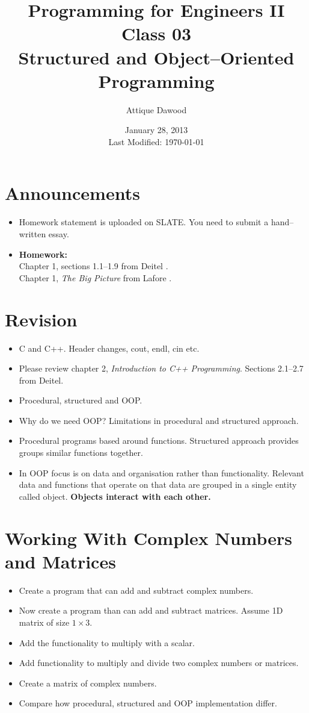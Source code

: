 \documentclass[12pt,a4paper]{article}
\title{\vspace{-2cm}Programming for Engineers II\\Class 03\\Structured and Object--Oriented Programming}
\author{Attique Dawood}
\date{January 28, 2013\\[0.2cm] Last Modified: \today}
\begin{document}
\maketitle
\section{Announcements}
\begin{itemize}
\item Homework statement is uploaded on SLATE. You need to submit a hand--written essay.
\item \textbf{Homework:}\\
Chapter 1, sections 1.1--1.9 from Deitel \cite{Deitel}.\\
Chapter 1, \textit{The Big Picture} from Lafore \cite{Lafore}.\\
\end{itemize}
\section{Revision}
\begin{itemize}
\item C and C++. Header changes, cout, endl, cin etc.
\item Please review chapter 2, \textit{Introduction to C++ Programming}. Sections 2.1--2.7 from Deitel.
\item Procedural, structured and OOP.
\item Why do we need OOP? Limitations in procedural and structured approach.
\item Procedural programs based around functions. Structured approach provides groups similar functions together.
\item In OOP focus is on data and organisation rather than functionality. Relevant data and functions that operate on that data are grouped in a single entity called object. \textbf{Objects interact with each other.}
\end{itemize}
\section{Working With Complex Numbers and Matrices}
\begin{itemize}
\item Create a program that can add and subtract complex numbers.
\item Now create a program than can add and subtract matrices. Assume 1D matrix of size $1\times 3$.
\item Add the functionality to multiply with a scalar.
\item Add functionality to multiply and divide two complex numbers or matrices.
\item Create a matrix of complex numbers.
\item Compare how procedural, structured and OOP implementation differ.
\end{itemize}
\end{document}
